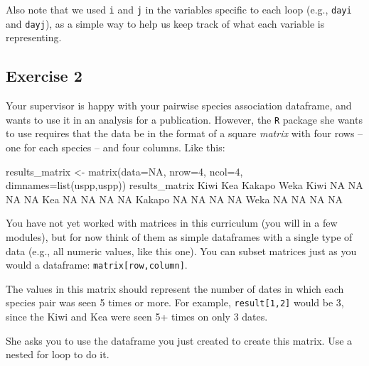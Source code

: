\documentclass[
]{book}
\newenvironment{Shaded}{\begin{snugshade}}{\end{snugshade}}
\newcommand{\AttributeTok}[1]{\textcolor[rgb]{0.77,0.63,0.00}{#1}}
\newcommand{\ConstantTok}[1]{\textcolor[rgb]{0.00,0.00,0.00}{#1}}
\newcommand{\DecValTok}[1]{\textcolor[rgb]{0.00,0.00,0.81}{#1}}
\newcommand{\FunctionTok}[1]{\textcolor[rgb]{0.00,0.00,0.00}{#1}}
\newcommand{\NormalTok}[1]{#1}
\newcommand{\OtherTok}[1]{\textcolor[rgb]{0.56,0.35,0.01}{#1}}
\begin{document}
Also note that we used \texttt{i} and \texttt{j} in the variables specific to each loop (e.g., \texttt{dayi} and \texttt{dayj}), as a simple way to help us keep track of what each variable is representing.

\hypertarget{exercise-2-7}{%
\subsection*{Exercise 2}\label{exercise-2-7}}

Your supervisor is happy with your pairwise species association dataframe, and wants to use it in an analysis for a publication. However, the \texttt{R} package she wants to use requires that the data be in the format of a square \emph{matrix} with four rows -- one for each species -- and four columns. Like this:

\begin{Shaded}
\begin{Highlighting}[]
\NormalTok{results\_matrix }\OtherTok{\textless{}{-}} \FunctionTok{matrix}\NormalTok{(}\AttributeTok{data=}\ConstantTok{NA}\NormalTok{, }\AttributeTok{nrow=}\DecValTok{4}\NormalTok{, }\AttributeTok{ncol=}\DecValTok{4}\NormalTok{, }\AttributeTok{dimnames=}\FunctionTok{list}\NormalTok{(uspp,uspp))}
\NormalTok{results\_matrix}
\NormalTok{       Kiwi Kea Kakapo Weka}
\NormalTok{Kiwi     }\ConstantTok{NA}  \ConstantTok{NA}     \ConstantTok{NA}   \ConstantTok{NA}
\NormalTok{Kea      }\ConstantTok{NA}  \ConstantTok{NA}     \ConstantTok{NA}   \ConstantTok{NA}
\NormalTok{Kakapo   }\ConstantTok{NA}  \ConstantTok{NA}     \ConstantTok{NA}   \ConstantTok{NA}
\NormalTok{Weka     }\ConstantTok{NA}  \ConstantTok{NA}     \ConstantTok{NA}   \ConstantTok{NA}
\end{Highlighting}
\end{Shaded}

You have not yet worked with matrices in this curriculum (you will in a few modules), but for now think of them as simple dataframes with a single type of data (e.g., all numeric values, like this one). You can subset matrices just as you would a dataframe: \texttt{matrix{[}row,column{]}}.

The values in this matrix should represent the number of dates in which each species pair was seen 5 times or more. For example, \texttt{result{[}1,2{]}} would be 3, since the Kiwi and Kea were seen 5+ times on only 3 dates.

She asks you to use the dataframe you just created to create this matrix. Use a nested for loop to do it.
\end{document}
